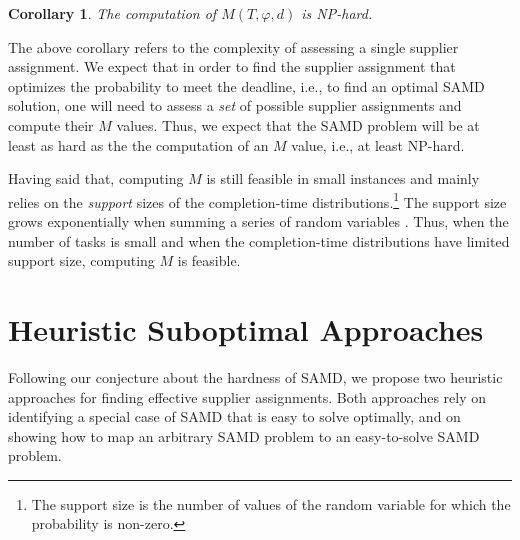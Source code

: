 \documentclass[letterpaper]{article} %
\newtheorem{corollary}{Corollary}
\newcommand{\samd}{\ac{SAMD}\xspace}
\newcommand\Tal[1]{\nb{\textbf{Tal:}}{green}{#1}}
\newcommand\Roni[1]{\nb{\textbf{Roni:}}{blue}{#1}}
\begin{document}


\begin{corollary}
The computation of $M(T, \varphi, d)$ is NP-hard.
\label{cor:m}
\end{corollary}
The above corollary refers to the complexity of assessing a single supplier assignment. We expect that in order to find the supplier assignment that optimizes the probability to meet the deadline, i.e., to find an optimal \samd solution, one will need to assess a \emph{set} of possible supplier assignments and compute their $M$ values. Thus, we expect that the \samd problem will be at least as hard as the the computation of an $M$ value, i.e., at least NP-hard. 



Having said that, computing $M$ is still feasible in small instances and mainly relies on the \emph{support} sizes of the completion-time distributions.\footnote{The support size is the number of values of the random variable for which the probability is non-zero.} The support size grows exponentially when summing a series of random variables \cite{cohen2015estimating}. Thus, when the number of tasks is small and when the completion-time distributions have limited support size, computing $M$ is feasible.

\section{Heuristic Suboptimal Approaches}

Following our conjecture about the hardness of \samd, we propose two heuristic approaches for finding effective supplier assignments. Both approaches rely on identifying a special case of \samd that is easy to solve optimally, and on showing how to map an arbitrary \samd problem to an easy-to-solve \samd problem. 
\end{document}
